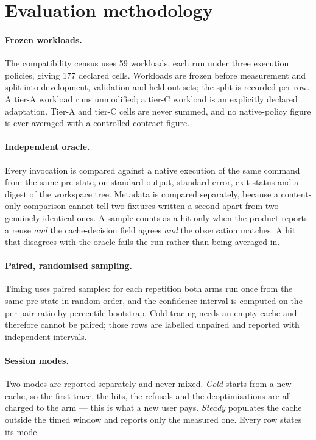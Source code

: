 \section{Evaluation methodology}

\paragraph{Frozen workloads.}
The compatibility census uses 59 workloads, each run under three execution policies, giving 177
declared cells. Workloads are frozen before measurement and split into development, validation and
held-out sets; the split is recorded per row. A tier-A workload runs unmodified; a tier-C workload
is an explicitly declared adaptation. Tier-A and tier-C cells are never summed, and no
native-policy figure is ever averaged with a controlled-contract figure.

\paragraph{Independent oracle.}
Every invocation is compared against a native execution of the same command from the same
pre-state, on standard output, standard error, exit status and a digest of the workspace tree.
Metadata is compared separately, because a content-only comparison cannot tell two fixtures
written a second apart from two genuinely identical ones. A sample counts as a hit only when the
product reports a reuse \emph{and} the cache-decision field agrees \emph{and} the observation
matches. A hit that disagrees with the oracle fails the run rather than being averaged in.

\paragraph{Paired, randomised sampling.}
Timing uses paired samples: for each repetition both arms run once from the same pre-state in
random order, and the confidence interval is computed on the per-pair ratio by percentile
bootstrap. Cold tracing needs an empty cache and therefore cannot be paired; those rows are
labelled unpaired and reported with independent intervals.

\paragraph{Session modes.}
Two modes are reported separately and never mixed. \emph{Cold} starts from a new cache, so the
first trace, the hits, the refusals and the deoptimisations are all charged to the arm --- this is
what a new user pays. \emph{Steady} populates the cache outside the timed window and reports only
the measured one. Every row states its mode.

